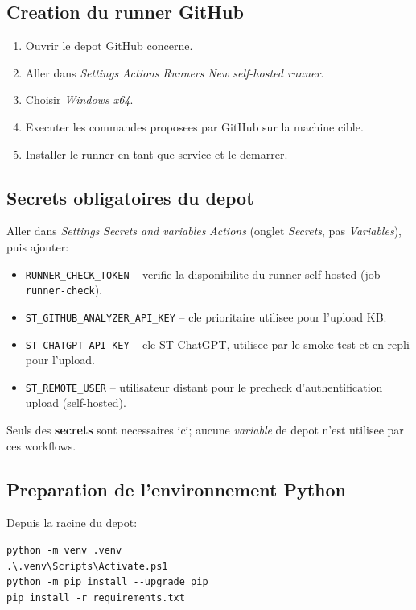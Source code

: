 \documentclass[11pt,a4paper]{article}
\begin{document}
\subsection{Creation du runner GitHub}
\begin{enumerate}[leftmargin=*]
  \item Ouvrir le depot GitHub concerne.
  \item Aller dans \emph{Settings} \textrightarrow{} \emph{Actions} \textrightarrow{} \emph{Runners} \textrightarrow{} \emph{New self-hosted runner}.
  \item Choisir \emph{Windows x64}.
  \item Executer les commandes proposees par GitHub sur la machine cible.
  \item Installer le runner en tant que service et le demarrer.
\end{enumerate}

\subsection{Secrets obligatoires du depot}
Aller dans \emph{Settings} \textrightarrow{} \emph{Secrets and variables} \textrightarrow{} \emph{Actions} (onglet \emph{Secrets}, pas \emph{Variables}), puis ajouter:
\begin{itemize}[leftmargin=*]
  \item \texttt{RUNNER\_CHECK\_TOKEN} -- verifie la disponibilite du runner self-hosted (job \texttt{runner-check}).
  \item \texttt{ST\_GITHUB\_ANALYZER\_API\_KEY} -- cle prioritaire utilisee pour l'upload KB.
  \item \texttt{ST\_CHATGPT\_API\_KEY} -- cle ST ChatGPT, utilisee par le smoke test et en repli pour l'upload.
  \item \texttt{ST\_REMOTE\_USER} -- utilisateur distant pour le precheck d'authentification upload (self-hosted).
\end{itemize}
Seuls des \textbf{secrets} sont necessaires ici; aucune \emph{variable} de depot n'est utilisee par ces workflows.

\subsection{Preparation de l'environnement Python}
Depuis la racine du depot:
\begin{lstlisting}[style=cmd]
python -m venv .venv
.\.venv\Scripts\Activate.ps1
python -m pip install --upgrade pip
pip install -r requirements.txt
\end{lstlisting}
\end{document}
